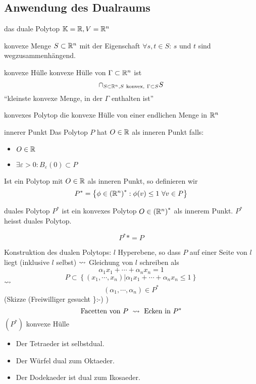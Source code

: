 \subsection{Anwendung des Dualraums}
das duale Polytop $\mathbb{K}=\mathbb{R}, V=\mathbb{R}^n$
\begin{Def}{konvexe Menge}
 $S\subset\mathbb{R}^n$ mit der Eigenschaft $\forall s,t\in S$: $s$ und $t$ sind wegzusammenhängend.
\end{Def}
\begin{Def}{konvexe Hülle}
  konvexe Hülle von $\Gamma\subset\mathbb{R}^n$ ist
  \[\cap_{S\subset\mb{R}^n, S\ \text{konvex},\ \Gamma\subset S} S\]
  ``kleinste konvexe Menge, in der $\Gamma$ enthalten ist''
\end{Def}
\begin{Def}{konvexes Polytop}
  die konvexe Hülle von einer endlichen Menge in $\mathbb{R}^n$
\end{Def}
\begin{Def}{innerer Punkt}
  Das Polytop $P$ hat $O\in \mathbb{R}$ als inneren Punkt falls:
  \begin{itemize}
    \item $O\in\mathbb{R}$
    \item $\exists \varepsilon>0:B_\varepsilon(0)\subset P$
  \end{itemize}
\end{Def}
\begin{Def}
  Ist ein Polytop mit $O\in\mathbb{R}$ als inneren Punkt, so definieren wir
  \[P^*=\left\{ \phi\in\left( \mathbb{R}^n \right)^*:\phi(v)\leq 1\ \forall v\in P \right\}\]
\end{Def}
\begin{Def}{duales Polytop}
  $P^*$ ist ein konvexes Polytop $O\in\left( \mathbb{R}^n \right)^*$ als innerem Punkt. $P^*$ heisst duales Polytop.
\end{Def}
\begin{Bem}
  \[P^**=P\]
\end{Bem}
\begin{Bem}
  Konstruktion des dualen Polytops:
  $l$ Hyperebene, so dass $P$ auf einer Seite von $l$ liegt (inklusive $l$ selbst) $\rightsquigarrow$ Gleichung von $l$ schreiben als
  \[\alpha_1x_1+\cdots+\alpha_nx_n=1\]
  \[P\subset \left\{ \left( x_1,\cdots,x_n \right)|\alpha_1x_1+\cdots+\alpha_nx_n\leq 1 \right\}\]
  $\rightsquigarrow$
  \[\left( \alpha_1,\cdots,\alpha_n \right)\in P^*\]
  (Skizze (Freiwilliger gesucht \}:-) )
  \[\text{Facetten von}\ P\ \rsa\ \text{Ecken in}\ P^*\]
  $(P^*)$ konvexe Hülle
\end{Bem}
\begin{Bsp}
  \begin{itemize}
    \item Der Tetraeder ist selbstdual.
    \item Der Würfel dual zum Oktaeder.
    \item Der Dodekaeder ist dual zum Ikosaeder.
  \end{itemize}
\end{Bsp}
